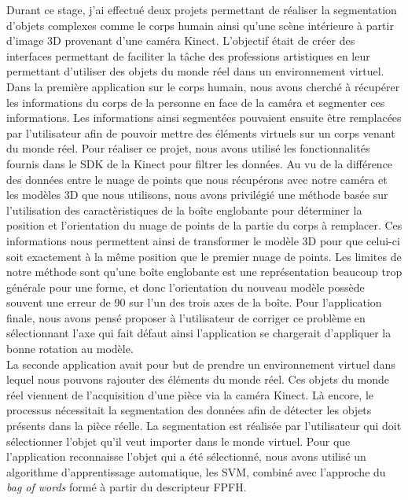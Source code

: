 Durant ce stage, j'ai effectué deux projets permettant de réaliser la segmentation d'objets complexes comme le corps
humain ainsi qu'une scène intérieure à partir d'image 3D provenant d'une caméra Kinect. L'objectif était de créer
des interfaces permettant de faciliter la tâche des professions artistiques en leur permettant d'utiliser 
des objets du monde réel dans un environnement virtuel. Dans la première application sur le corps humain,
nous avons cherché à récupérer les informations du corps de la personne en face de la caméra et segmenter
ces informations. Les informations ainsi segmentées pouvaient ensuite être remplacées par l'utilisateur afin de 
pouvoir mettre des éléments virtuels sur un corps venant du monde réel. Pour réaliser ce projet, nous avons 
utilisé les fonctionnalités fournis dans le SDK de la Kinect pour filtrer les données. Au vu de la différence
des données entre le nuage de points que nous récupérons avec notre caméra et les modèles 3D que nous utilisons,
nous avons privilégié une méthode basée sur l'utilisation des caractèristiques de la boîte englobante pour
déterminer la position et l'orientation du nuage de points de la partie du corps à remplacer. Ces informations
nous permettent ainsi de transformer le modèle 3D pour que celui-ci soit exactement à la même position que
le premier nuage de points. Les limites de notre méthode sont qu'une boîte englobante est une représentation 
beaucoup trop générale pour une forme, et donc l'orientation du nouveau modèle possède souvent une erreur de 90\degre
sur l'un des trois axes de la boîte. Pour l'application finale, nous avons pensé proposer à l'utilisateur de 
corriger ce problème en sélectionnant l'axe qui fait défaut ainsi l'application se chargerait d'appliquer la
bonne rotation au modèle.\\

La seconde application avait pour but de prendre un environnement virtuel dans lequel nous pouvons rajouter des éléments 
du monde réel. Ces objets du monde réel viennent de l'acquisition d'une pièce via la caméra Kinect. Là encore, le processus nécessitait 
la segmentation des données afin de détecter les objets présents dans la pièce réelle. La segmentation est réalisée 
par l'utilisateur qui doit sélectionner l'objet qu'il veut importer dans le monde virtuel. Pour que l'application
reconnaisse l'objet qui a été sélectionné, nous avons utilisé un algorithme d'apprentissage automatique, les SVM,
combiné avec l'approche du \textit{bag of words} formé à partir du descripteur FPFH.\\


